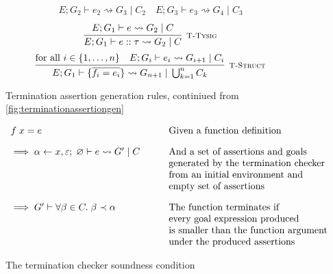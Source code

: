 \begin{figure}
\[{\begin{array}{c}
                E; G_2 \vdash e_2 \rightsquigarrow G_3\; |\; C_2
                \hspace{1em}
                E; G_3 \vdash e_3 \rightsquigarrow G_4\; |\; C_3
            \end{array}
        }
    \]
    \vspace{0.5pt}
    \[
        \infer[\textsc{\footnotesize T-Tysig}]{
            E; G_1 \vdash e :: \tau
                \rightsquigarrow G_2\; |\; C
        }{
            E; G_1 \vdash e \rightsquigarrow G_2\; |\; C
        }
    \]
    \vspace{0.5pt}
    \[
        \infer[\textsc{\footnotesize T-Struct}]{
            E; G_1 \vdash \{\overline{f_i = e_i}\}
                \rightsquigarrow G_{n+1}\; |\; \bigcup_{k = 1}^n C_k
        }{
           \text{for all } i \in \{1, \dots, n\}\quad  E; G_i \vdash e_i 
                \rightsquigarrow G_{i+1}\; |\; C_i
        }
    \]
    
    \caption{Termination assertion generation rules,
             continiued from \autoref{fig:terminationassertiongen}}
    \label{fig:terminationassertiongen2}
\end{figure}


\begin{figure}
    \centering
    \[
        \begin{array}{ll}
            f\; x = e              
                & \text{Given a function definition} \\[10pt]
            \implies \alpha \leftarrow x,\varepsilon;\; \varnothing 
                \vdash e \rightsquigarrow G'\; |\; C
                \hspace{2em}
                & \text{And a set of assertions and goals} \\
                & \text{generated by the termination checker} \\
                & \text{from an initial environment and} \\
                & \text{empty set of assertions} \\[10pt]
            \implies G' \vdash \forall \beta \in C.\; \beta \prec \alpha
                & \text{The function terminates if} \\
                & \text{every goal expression produced} \\
                & \text{is smaller than the function argument} \\
                & \text{under the produced assertions}
        \end{array}
    \]
    
    \caption{The termination checker soundness condition}
    \label{fig:terminationcondition}
\end{figure}

